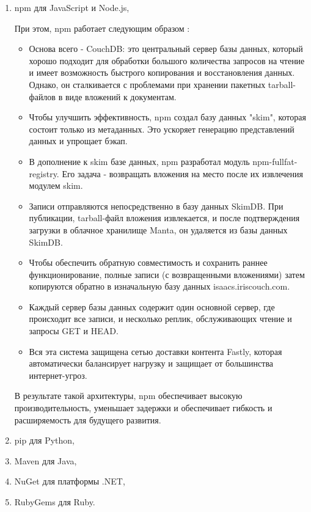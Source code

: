 \begin{enumerate}
\item npm \cite{packages:npm} для JavaScript и Node.js,

При этом, npm работает следующим образом \cite{arch:npm_moment}:
\begin{itemize}
    \item Основа всего - CouchDB: это центральный сервер базы данных, который хорошо подходит для обработки большого количества запросов на чтение и имеет возможность быстрого копирования и восстановления данных. Однако, он сталкивается с проблемами при хранении пакетных tarball-файлов в виде вложений к документам.
    \item Чтобы улучшить эффективность, npm создал базу данных "skim", которая состоит только из метаданных. Это ускоряет генерацию представлений данных и упрощает бэкап.
    \item В дополнение к skim базе данных, npm разработал модуль npm-fullfat-registry. Его задача - возвращать вложения на место после их извлечения модулем skim.
    \item Записи отправляются непосредственно в базу данных SkimDB. При публикации, tarball-файл вложения извлекается, и после подтверждения загрузки в облачное хранилище Manta, он удаляется из базы данных SkimDB.
    \item Чтобы обеспечить обратную совместимость и сохранить раннее функционирование, полные записи (с возвращенными вложениями) затем копируются обратно в изначальную базу данных isaacs.iriscouch.com.
    \item Каждый сервер базы данных содержит один основной сервер, где происходит все записи, и несколько реплик, обслуживающих чтение и запросы GET и HEAD.
    \item Вся эта система защищена сетью доставки контента Fastly, которая автоматически балансирует нагрузку и защищает от большинства интернет-угроз.
\end{itemize}

В результате такой архитектуры, npm обеспечивает высокую производительность, уменьшает задержки и обеспечивает гибкость и расширяемость для будущего развития.

\item pip \cite{packages:pip} для Python,
\item Maven \cite{packages:maven} для Java,
\item NuGet \cite{packages:nuget} для платформы .NET,
\item RubyGems \cite{packages:rubygems} для Ruby.
\end{enumerate}

